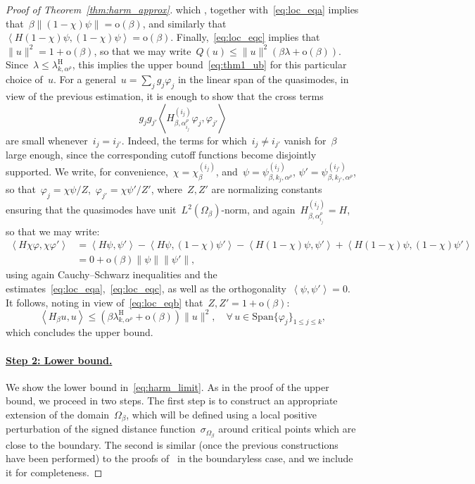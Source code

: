 \documentclass[10pt]{article}
\newcommand{\1}{\mathbbm 1}
\newcommand{\shift}{\rho} %
\renewcommand{\o}{\mathrm{o}}
\begin{document}
\begin{proof}[Proof of Theorem~\ref{thm:harm_approx}]
        which , together with~\eqref{eq:loc_eqa} implies that~$\beta\|(1-\chi)\psi\|=\o(\beta)$, and similarly that~$\left\langle H(1-\chi)\psi,(1-\chi)\psi\right\rangle = \o(\beta)$.
        Finally,~\eqref{eq:loc_eqc} implies that~$\|u\|^2 = 1 + \o(\beta)$, so that we may write~$Q(u)\leq \|u\|^2(\beta\lambda + \o(\beta))$.
        Since~$\lambda\leq \lambda_{k,\alpha^\shift}^{\mathrm H}$, this implies the upper bound~\eqref{eq:thm1_ub} for this particular choice of~$u$.
        For a general~$u = \sum_j g_j \varphi_j$ in the linear span of the quasimodes, in view of the previous estimation, it is enough to show that the cross terms
        \[g_jg_{j'}\left\langle H_{\beta,\alpha_{i_j}^\shift}^{(i_j)}\varphi_j,\varphi_{j'}\right\rangle\]
        are small whenever~$i_j = i_{j'}$. Indeed, the terms for which~$i_j \neq i_{j'}$ vanish for~$\beta$ large enough, since the corresponding cutoff functions become disjointly supported.
        We write, for convenience,~$\chi = \chi_\beta^{(i_j)}$, and~$\psi = \psi^{(i_j)}_{\beta,k_j,\alpha^\shift}$, $\psi' = \psi^{(i_{j'})}_{\beta,k_{j'},\alpha^\shift}$, so that~$\varphi_j = \chi \psi/Z$,~$\varphi_{j'} = \chi\psi'/Z'$, where~$Z,Z'$ are normalizing constants ensuring that the quasimodes have unit~$L^2(\Omega_\beta)$-norm, and again~$H_{\beta,\alpha_{i_j}^\shift}^{(i_j)}=H$, so that we may write:
        \[\begin{aligned}
            \left\langle H\chi\varphi,\chi\varphi'\right\rangle &= \left\langle H\psi,\psi'\right\rangle - \left\langle H\psi,(1-\chi)\psi'\right\rangle - \left\langle H(1-\chi)\psi,\psi'\right\rangle + \left\langle H(1-\chi)\psi,(1-\chi)\psi'\right\rangle\\
            &= 0 + \o(\beta)\|\psi\|\|\psi'\|,
        \end{aligned}
        \]
        using again Cauchy--Schwarz inequalities and the estimates~\eqref{eq:loc_eqa},~\eqref{eq:loc_eqc}, as well as the orthogonality~$\left\langle \psi,\psi'\right\rangle = 0$.
        It follows, noting in view of~\eqref{eq:loc_eqb} that~$Z,Z' = 1 +\o(\beta)$:
        \[\left\langle H_\beta u,u\right\rangle \leq (\beta\lambda_{k,\alpha^\shift}^{\mathrm H}+\o(\beta))\|u\|^2,\quad \forall\,u\in\mathrm{Span}\{\varphi_j\}_{1\leq j\leq k},\]
        which concludes the upper bound.

        \paragraph{\underline{Step 2: Lower bound.}}
        We show the lower bound in~\eqref{eq:harm_limit}. As in the proof of the upper bound, we proceed in two steps.
        The first step is to construct an appropriate extension of the domain~$\Omega_\beta$, which will be defined using a local positive perturbation of the signed distance function~$\sigma_{\Omega_\beta}$ around critical points which are close to the boundary.
        The second is similar (once the previous constructions have been performed) to the proofs of~\cite{S83,CFKS87} in the boundaryless case, and we include it for completeness.


\end{proof}
\end{document}
